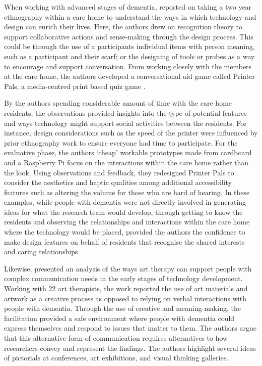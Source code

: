 When working with advanced stages of dementia, \cite{foley_struggle_2019} reported on taking a two year ethnography within a care home to understand the ways in which technology and design can enrich their lives. Here, the authors drew on recognition theory to support collaborative actions and sense-making through the design process. This could be through the use of a participants individual items with person meaning, such as a participant and their scarf; or the designing of tools or probes as a way to encourage and support conversation. From working closely with the members at the care home, the authors developed a conversational aid game called Printer Pals, a media-centred print based quiz game \citep{foley_printer_2019}. 

By the authors spending considerable amount of time with the care home residents, the observations provided insights into the type of potential features and ways technology might support social activities between the residents. For instance, design considerations such as the speed of the printer were influenced by prior ethnography work to ensure everyone had time to participate. For the evaluative phase, the authors `cheap' workable prototypes made from cardboard and a Raspberry Pi focus on the interactions within the care home rather than the look. Using observations and feedback, they redesigned Printer Pals to consider the aesthetics and haptic qualities among additional accessibility features such as altering the volume for those who are hard of hearing. In these examples, while people with dementia were not directly involved in generating ideas for what the research team would develop, through getting to know the residents and observing the relationships and interactions within the care home where the technology would be placed, provided the authors the confidence to make design features on behalf of residents that recognise the shared interests and caring relationships.

Likewise, \cite{lazar2018making} presented an analysis of the ways art therapy can support people with complex communication needs in the early stages of technology development. Working with 22 art therapists, the work reported the use of art materials and artwork as a creative process as opposed to relying on verbal interactions with people with dementia. Through the use of creative and meaning-making, the facilitation provided a safe environment where people with dementia could express themselves and respond to issues that matter to them. The authors argue that this alternative form of communication requires alternatives to how researchers convey and represent the findings. The authors highlight several ideas of pictorials at conferences, art exhibitions, and visual thinking galleries.

